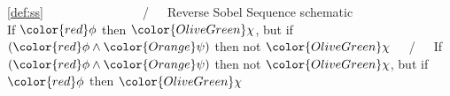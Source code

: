\ref{def:ss}~~~~~~~~~~~~~~~~/~~~{\color{seeblau100}Reverse Sobel Sequence schematic}\\
\phantom{\ref*{def:ss}}\hspace{14.5mm}If $\color{red}\phi$ then $\color{OliveGreen}\chi$, but if $({\color{red}\phi}\land{\color{Orange}\psi})$ then not $\color{OliveGreen}\chi$~~~/~~~If $({\color{red}\phi}\land{\color{Orange}\psi})$ then not $\color{OliveGreen}\chi$, but if $\color{red}\phi$ then $\color{OliveGreen}\chi$\vskip 9.25pt